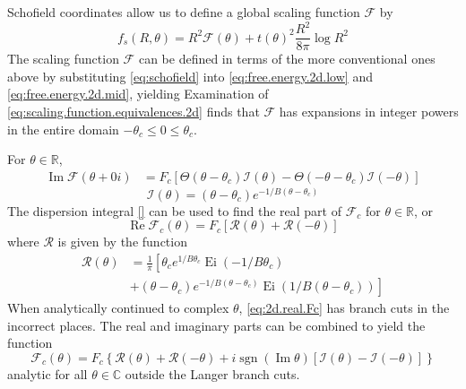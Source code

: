 \documentclass[
  aps,
  pre,
  reprint,
  longbibliography,
  floatfix
]{revtex4-2}
\begin{document}
Schofield coordinates allow us to define a global scaling function $\mathcal F$ by
\begin{equation} \label{eq:schofield.2d.free.energy}
  f_s(R, \theta) = R^2\mathcal F(\theta) + t(\theta)^2\frac{R^2}{8\pi}\log R^2
\end{equation}
The scaling function $\mathcal F$ can be defined in terms of the more
conventional ones above by substituting \eqref{eq:schofield} into \eqref{eq:free.energy.2d.low} and
\eqref{eq:free.energy.2d.mid}, yielding
Examination of \eqref{eq:scaling.function.equivalences.2d} finds that $\mathcal F$ has expansions in integer powers in the entire domain $-\theta_c\leq0\leq\theta_c$.

For $\theta\in\mathbb R$,
\begin{equation}
  \begin{aligned}
    \operatorname{Im}\mathcal F(\theta+0i)&=F_c[\Theta(\theta-\theta_c)\mathcal I(\theta)-\Theta(-\theta-\theta_c)\mathcal I(-\theta)]
  \end{aligned}
\end{equation}
\begin{equation}
  \mathcal I(\theta)=(\theta-\theta_c)e^{-1/B(\theta-\theta_c)}
\end{equation}
The dispersion integral \eqref{} can be used to find the real part of $\mathcal F_c$ for $\theta\in\mathbb R$, or
\begin{equation} \label{eq:2d.real.Fc}
  \operatorname{Re}\mathcal F_c(\theta)=F_c[\mathcal R(\theta)+\mathcal R(-\theta)]
\end{equation}
where $\mathcal R$ is given by the function
\begin{equation}
  \begin{aligned}
  \mathcal R(\theta)
  &=\frac1\pi\left[
    \theta_ce^{1/B\theta_c}\operatorname{Ei}(-1/B\theta_c)
    \right.\\
  &\left.
    +(\theta-\theta_c)e^{-1/B(\theta-\theta_c)}\operatorname{Ei}(1/B(\theta-\theta_c))
  \right]
  \end{aligned}
\end{equation}
When analytically continued to complex $\theta$, \eqref{eq:2d.real.Fc} has branch cuts in the incorrect places. The real and imaginary parts can be combined to yield the function
\begin{equation}
  \mathcal F_c(\theta)=F_c\left\{
    \mathcal R(\theta)+\mathcal R(-\theta)+i\operatorname{sgn}(\operatorname{Im}\theta)[\mathcal I(\theta)-\mathcal I(-\theta)]
  \right\}
\end{equation}
analytic for all $\theta\in\mathbb C$ outside the Langer branch cuts.
\end{document}

